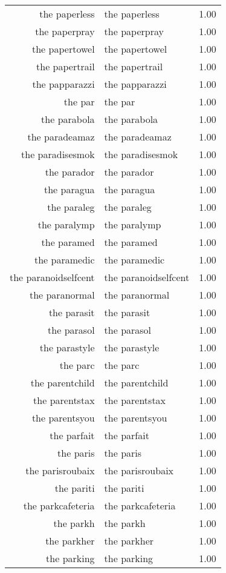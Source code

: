 \begin{table}[ht]
\begin{tabular}{rlr}
  the paperless & the paperless & 1.00 \\ 
  the paperpray & the paperpray & 1.00 \\ 
  the papertowel & the papertowel & 1.00 \\ 
  the papertrail & the papertrail & 1.00 \\ 
  the papparazzi & the papparazzi & 1.00 \\ 
  the par & the par & 1.00 \\ 
  the parabola & the parabola & 1.00 \\ 
  the paradeamaz & the paradeamaz & 1.00 \\ 
  the paradisesmok & the paradisesmok & 1.00 \\ 
  the parador & the parador & 1.00 \\ 
  the paragua & the paragua & 1.00 \\ 
  the paraleg & the paraleg & 1.00 \\ 
  the paralymp & the paralymp & 1.00 \\ 
  the paramed & the paramed & 1.00 \\ 
  the paramedic & the paramedic & 1.00 \\ 
  the paranoidselfcent & the paranoidselfcent & 1.00 \\ 
  the paranormal & the paranormal & 1.00 \\ 
  the parasit & the parasit & 1.00 \\ 
  the parasol & the parasol & 1.00 \\ 
  the parastyle & the parastyle & 1.00 \\ 
  the parc & the parc & 1.00 \\ 
  the parentchild & the parentchild & 1.00 \\ 
  the parentstax & the parentstax & 1.00 \\ 
  the parentsyou & the parentsyou & 1.00 \\ 
  the parfait & the parfait & 1.00 \\ 
  the paris & the paris & 1.00 \\ 
  the parisroubaix & the parisroubaix & 1.00 \\ 
  the pariti & the pariti & 1.00 \\ 
  the parkcafeteria & the parkcafeteria & 1.00 \\ 
  the parkh & the parkh & 1.00 \\ 
  the parkher & the parkher & 1.00 \\ 
  the parking & the parking & 1.00 \\ 

\end{tabular}
\end{table}
